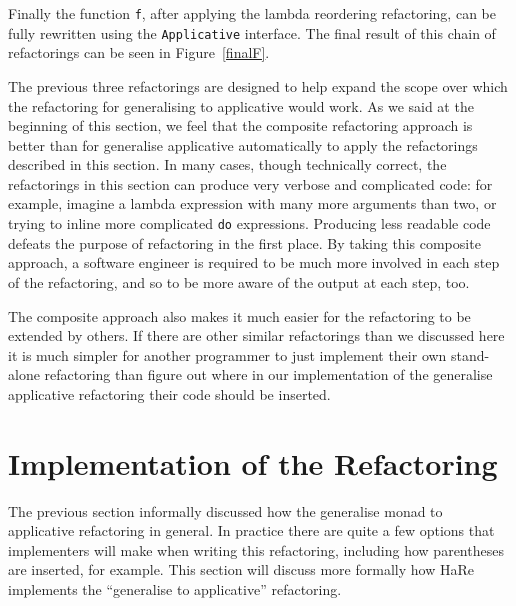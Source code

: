 Finally the function \texttt{f}, after applying the lambda reordering refactoring, can be fully rewritten using the \texttt{Applicative} interface. The final result of this chain of refactorings can be seen in Figure~\ref{finalF}.


The previous three refactorings are designed to help expand the scope over which the refactoring for generalising to applicative would work. As we said at the beginning of this section, we feel that the composite refactoring approach is better than for generalise applicative automatically to apply the refactorings described in this section. In many cases, though technically correct, the refactorings in this section can produce very verbose and complicated code: for example, imagine a lambda expression with many more arguments than two, or trying to inline more complicated \texttt{do} expressions. Producing less readable code  defeats the purpose of refactoring in the first place. By taking this composite approach,  a software engineer is required to be much more involved in each step of the refactoring, and so to be more aware of the output at each step, too. 

The composite approach also makes it much easier for the refactoring to be extended by others. If there are other similar refactorings than we discussed here it is much simpler for another programmer to just implement their own stand-alone refactoring  than figure out where in our implementation of the generalise applicative refactoring their code should be inserted. 

\section{Implementation of the Refactoring}
\label{sec:refacImp}

The previous section informally discussed how the generalise monad to applicative refactoring in general. In practice there are quite a few options that implementers will make when writing this refactoring, including how parentheses are inserted, for example. This section will discuss more formally how HaRe implements the ``generalise to applicative'' refactoring.


